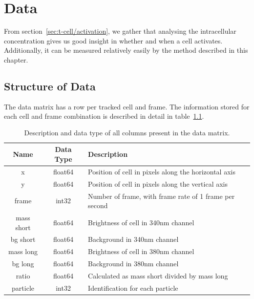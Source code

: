 \chapter{Data}
\label{chapter:data}

From section~\ref{sec:t-cell/activation}, we gather that analysing the intracellular \Calcium concentration gives us good insight in whether and when a cell activates. Additionally, it can be measured relatively easily by the method described in this chapter.

\section{Structure of Data}

The data matrix has a row per tracked cell and frame. The information stored for each cell and frame combination is described in detail in table~\ref{tab:information_data_matrix}.

\begin{table}[h!]
	\centering
	\begin{tabular}{|c|c|l|}
		\hline
		\textbf{Name} & \textbf{Data Type} & \textbf{Description} \\
		\hline
		x & float64 & Position of cell in pixels along the horizontal axis \\
		\hline
		y & float64 & Position of cell in pixels along the vertical axis \\
		\hline
		frame & int32 & Number of frame, with frame rate of 1 frame per second \\
		\hline
		mass short & float64 & Brightness of cell in 340nm channel \\
		\hline
		bg short & float64 & Background in 340nm channel \\
		\hline
		mass long & float64 & Brightness of cell in 380nm channel \\
		\hline
		bg long & float64 & Background in 380nm channel \\
		\hline
		ratio & float64 & Calculated as mass short divided by mass long \\
		\hline
		particle & int32 & Identification for each particle \\
		\hline
	\end{tabular}
	\caption{Description and data type of all columns present in the data matrix.}
	\label{tab:information_data_matrix}
\end{table}


